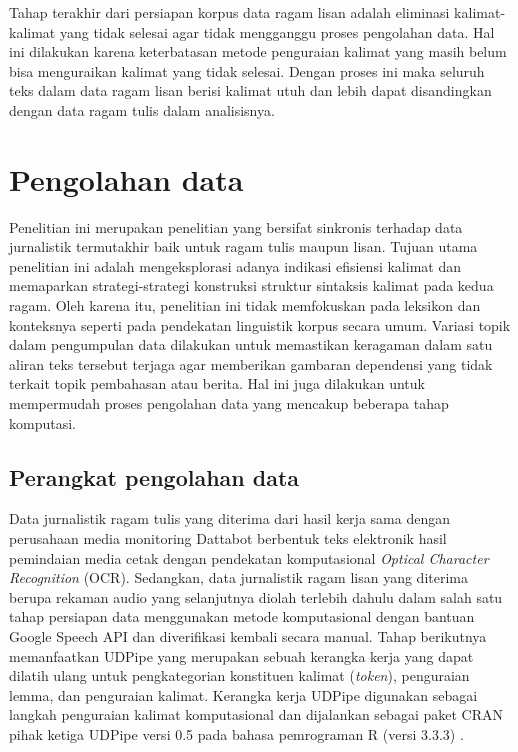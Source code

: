 Tahap terakhir dari persiapan korpus data ragam lisan adalah eliminasi kalimat-kalimat yang tidak selesai agar tidak mengganggu proses pengolahan data. Hal ini dilakukan karena keterbatasan metode penguraian kalimat yang masih belum bisa menguraikan kalimat yang tidak selesai. Dengan proses ini maka seluruh teks dalam data ragam lisan berisi kalimat utuh dan lebih dapat disandingkan dengan data ragam tulis dalam analisisnya.

\section{Pengolahan data}

Penelitian ini merupakan penelitian yang bersifat sinkronis terhadap data jurnalistik termutakhir baik untuk ragam tulis maupun lisan. Tujuan utama penelitian ini adalah mengeksplorasi adanya indikasi efisiensi kalimat dan memaparkan strategi-strategi konstruksi struktur sintaksis kalimat pada kedua ragam. Oleh karena itu, penelitian ini tidak memfokuskan pada leksikon dan konteksnya seperti pada pendekatan linguistik korpus secara umum. Variasi topik dalam pengumpulan data dilakukan untuk memastikan keragaman dalam satu aliran teks tersebut terjaga agar memberikan gambaran dependensi yang tidak terkait topik pembahasan atau berita. Hal ini juga dilakukan untuk mempermudah proses pengolahan data yang mencakup beberapa tahap komputasi.

\subsection{Perangkat pengolahan data}
Data jurnalistik ragam tulis yang diterima dari hasil kerja sama dengan perusahaan media monitoring Dattabot berbentuk teks elektronik hasil pemindaian media cetak dengan pendekatan komputasional \textit{Optical Character Recognition} (OCR). Sedangkan, data jurnalistik ragam lisan yang diterima berupa rekaman audio yang selanjutnya diolah terlebih dahulu dalam salah satu tahap persiapan data menggunakan metode komputasional dengan bantuan Google Speech API dan diverifikasi kembali secara manual. Tahap berikutnya memanfaatkan UDPipe \citep{udpipe2017} yang merupakan sebuah kerangka kerja yang dapat dilatih ulang untuk pengkategorian konstituen kalimat (\textit{token}), penguraian lemma, dan penguraian kalimat. Kerangka kerja UDPipe digunakan sebagai langkah penguraian kalimat komputasional dan dijalankan sebagai paket CRAN pihak ketiga UDPipe versi 0.5 \cite{udpipe2017manual} pada bahasa pemrograman R (versi 3.3.3) \citep{r2017project}. 

